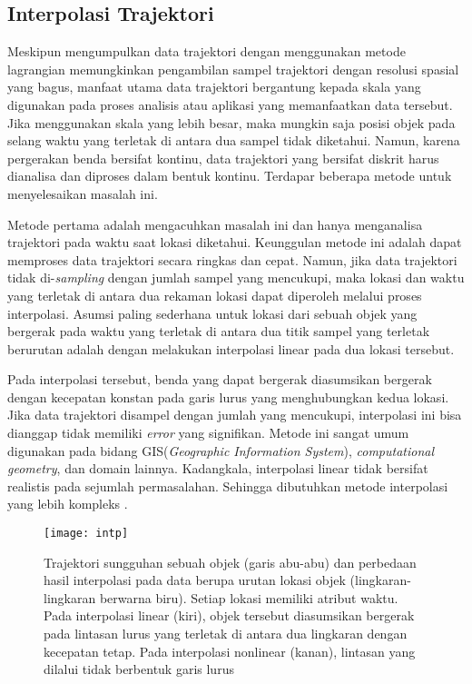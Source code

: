\subsection{Interpolasi Trajektori}
Meskipun mengumpulkan data trajektori dengan menggunakan metode lagrangian memungkinkan pengambilan sampel trajektori dengan resolusi spasial yang bagus, manfaat utama data trajektori bergantung kepada skala yang digunakan pada proses analisis atau aplikasi yang memanfaatkan data tersebut. Jika menggunakan skala yang lebih besar, maka mungkin saja posisi objek pada selang waktu yang terletak di antara dua sampel tidak diketahui. Namun, karena pergerakan benda bersifat kontinu, data trajektori yang bersifat diskrit harus dianalisa dan diproses dalam bentuk kontinu. Terdapar beberapa metode untuk menyelesaikan masalah ini.
\par Metode pertama adalah mengacuhkan masalah ini dan hanya menganalisa trajektori pada waktu saat lokasi diketahui. Keunggulan metode ini adalah dapat memproses data trajektori secara ringkas dan cepat. Namun, jika data trajektori tidak di-\textit{sampling} dengan jumlah sampel yang mencukupi, maka lokasi dan waktu yang terletak di antara dua rekaman lokasi dapat diperoleh melalui proses interpolasi. Asumsi paling sederhana untuk lokasi dari sebuah objek yang bergerak pada waktu yang terletak di antara dua titik sampel yang terletak berurutan adalah dengan melakukan interpolasi linear pada dua lokasi tersebut. 
\par Pada interpolasi tersebut, benda yang dapat bergerak diasumsikan bergerak dengan kecepatan konstan pada garis lurus yang menghubungkan kedua lokasi. Jika data trajektori disampel dengan jumlah yang mencukupi, interpolasi ini bisa dianggap tidak memiliki \textit{error} yang signifikan. Metode ini sangat umum digunakan pada bidang GIS(\textit{Geographic Information System}), \textit{computational geometry}, dan domain lainnya. Kadangkala, interpolasi linear tidak bersifat realistis pada sejumlah permasalahan. Sehingga dibutuhkan metode interpolasi yang lebih kompleks \cite{wiratma:19:computations}.
\begin{figure}[H]
	\centering  
	\texttt{[image: intp]}  
	\caption{Trajektori sungguhan sebuah objek (garis abu-abu) dan perbedaan hasil interpolasi pada data berupa urutan lokasi objek (lingkaran-lingkaran berwarna biru). Setiap lokasi memiliki atribut waktu. Pada interpolasi linear (kiri), objek tersebut diasumsikan bergerak pada lintasan lurus yang terletak di antara dua lingkaran dengan kecepatan tetap. Pada interpolasi nonlinear (kanan), lintasan yang dilalui tidak berbentuk garis lurus} 
	\label{fig:interp} 
\end{figure}

